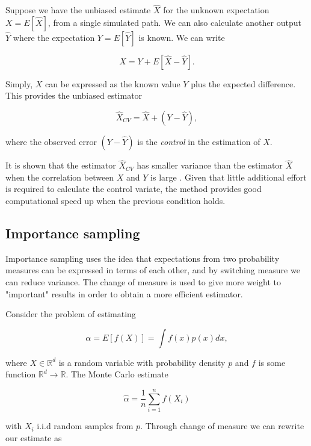Suppose we have the unbiased estimate $\hat{X}$ for the unknown expectation $X = E[\hat{X}]$, from a single simulated path. We can also calculate another output $\hat{Y}$ where the expectation $Y = E[\hat{Y}]$ is known. We can write

\begin{equation*}
    X = Y + E[\hat{X} - \hat{Y}].
\end{equation*}

Simply, $X$ can be expressed as the known value $Y$ plus the expected difference. This provides the unbiased estimator

\begin{equation*}
    \hat{X}_{CV} = \hat{X} + (Y - \hat{Y}),
\end{equation*}

where the observed error $(Y - \hat{Y})$ is the \textit{control} in the estimation of $X$.

It is shown that the estimator $\hat{X}_{CV}$ has smaller variance than the estimator $\hat{X}$ when the correlation between $X$ and $Y$ is large \cite{boyle1997monte}. Given that little additional effort is required to calculate the control variate, the method provides good computational speed up when the previous condition holds.

\subsection{Importance sampling}
Importance sampling uses the idea that expectations from two probability measures can be expressed in terms of each other, and by switching measure we can reduce variance. The change of measure is used to give more weight to "important" results in order to obtain a more efficient estimator.

Consider the problem of estimating

\begin{equation*}
    \alpha = E[f(X)] = \int f(x) p(x) dx,
\end{equation*}

where $X \in \mathbb{R}^d$ is a random variable with probability density $p$ and $f$ is some function $\mathbb{R}^d \to \mathbb{R}$. The Monte Carlo estimate 

\begin{equation*}
    \hat{\alpha} = \frac{1}{n} \sum_{i=1}^n f(X_i)
\end{equation*}

with $X_i$ i.i.d random samples from $p$. Through change of measure we can rewrite our estimate as

